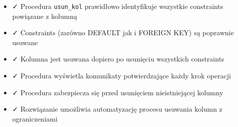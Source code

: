 \documentclass[a4paper,11pt]{article}
\begin{document}
	\begin{itemize}
		\item ✓ Procedura \texttt{usun\_kol} prawidłowo identyfikuje wszystkie constraints powiązane z kolumną
		\item ✓ Constraints (zarówno DEFAULT jak i FOREIGN KEY) są poprawnie usuwane
		\item ✓ Kolumna jest usuwana dopiero po usunięciu wszystkich constraints
		\item ✓ Procedura wyświetla komunikaty potwierdzające każdy krok operacji
		\item ✓ Procedura zabezpiecza się przed usunięciem nieistniejącej kolumny
		\item ✓ Rozwiązanie umożliwia automatyzację procesu usuwania kolumn z ograniczeniami
	\end{itemize}
	
\end{document}
